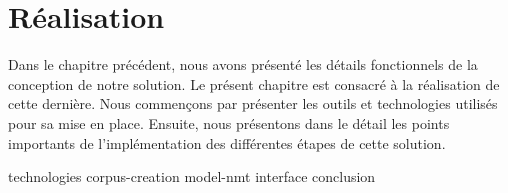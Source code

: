 \chapter{Réalisation}
\label{chap.realisation}

Dans le chapitre précédent, nous avons présenté les détails fonctionnels de la conception de notre solution.
Le présent chapitre est consacré à la réalisation de cette dernière.
Nous commençons par présenter les outils et technologies utilisés pour sa mise en place.
Ensuite, nous présentons dans le détail les points importants de l'implémentation des différentes étapes de cette solution.

{technologies}
{corpus-creation}
{model-nmt}
{interface}
{conclusion}